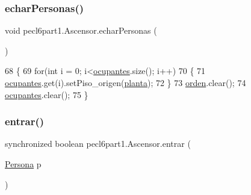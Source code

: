\subsubsection{\texorpdfstring{echar\+Personas()}{echarPersonas()}}
{\footnotesize\ttfamily void pecl6part1.\+Ascensor.\+echar\+Personas (\begin{DoxyParamCaption}{ }\end{DoxyParamCaption})\hspace{0.3cm}{\ttfamily [inline]}}


\begin{DoxyCode}
68     \{
69         \textcolor{keywordflow}{for}(\textcolor{keywordtype}{int} i = 0; i<\mbox{\hyperlink{classpecl6part1_1_1_ascensor_aabf71a3bf26b3bff458534e518835c71}{ocupantes}}.size(); i++)
70         \{
71             \mbox{\hyperlink{classpecl6part1_1_1_ascensor_aabf71a3bf26b3bff458534e518835c71}{ocupantes}}.get(i).setPiso\_origen(\mbox{\hyperlink{classpecl6part1_1_1_ascensor_a580b836287ba07c6658c03a5e35fbbdb}{planta}});
72         \}
73         \mbox{\hyperlink{classpecl6part1_1_1_ascensor_adbe3c1b625d285b4b5011ef0235f3c9f}{orden}}.clear();
74         \mbox{\hyperlink{classpecl6part1_1_1_ascensor_aabf71a3bf26b3bff458534e518835c71}{ocupantes}}.clear();
75     \}
\end{DoxyCode}
\mbox{\label{classpecl6part1_1_1_ascensor_a6a9eff62048897df3cd1a4c1ffd3d979}} 
\subsubsection{\texorpdfstring{entrar()}{entrar()}}
{\footnotesize\ttfamily synchronized boolean pecl6part1.\+Ascensor.\+entrar (\begin{DoxyParamCaption}\item[{\mbox{\hyperlink{classpecl6part1_1_1_persona}{Persona}}}]{p }\end{DoxyParamCaption})\hspace{0.3cm}{\ttfamily [inline]}}


